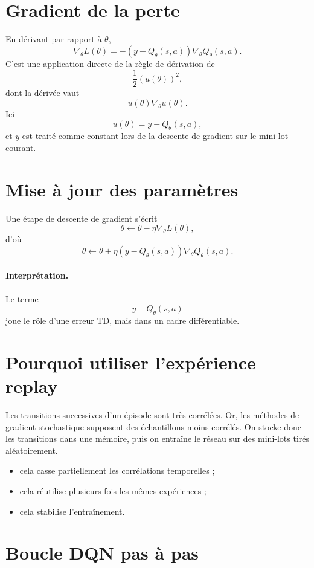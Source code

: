 \documentclass[11pt,a4paper]{article}
\begin{document}
\section{Gradient de la perte}

En dérivant par rapport à $\theta$,
\[
\nabla_{\theta}L(\theta)
= -\left(y-Q_{\theta}(s,a)\right)\nabla_{\theta}Q_{\theta}(s,a).
\]
C'est une application directe de la règle de dérivation de
\[
\frac12(u(\theta))^2,
\]
dont la dérivée vaut
\[
u(\theta)\nabla_{\theta}u(\theta).
\]
Ici
\[
u(\theta)=y-Q_{\theta}(s,a),
\]
et $y$ est traité comme constant lors de la descente de gradient sur le mini-lot courant.

\section{Mise à jour des paramètres}

Une étape de descente de gradient s'écrit
\[
\theta \leftarrow \theta - \eta \nabla_{\theta}L(\theta),
\]
d'où
\[
\theta \leftarrow \theta + \eta \left(y-Q_{\theta}(s,a)\right)\nabla_{\theta}Q_{\theta}(s,a).
\]

\paragraph{Interprétation.}
Le terme
\[
y-Q_{\theta}(s,a)
\]
joue le rôle d'une erreur TD, mais dans un cadre différentiable.

\section{Pourquoi utiliser l'expérience replay}

Les transitions successives d'un épisode sont très corrélées. Or, les méthodes de gradient stochastique supposent des échantillons moins corrélés. On stocke donc les transitions dans une mémoire, puis on entraîne le réseau sur des mini-lots tirés aléatoirement.

\begin{itemize}[leftmargin=1.6em]
    \item cela casse partiellement les corrélations temporelles ;
    \item cela réutilise plusieurs fois les mêmes expériences ;
    \item cela stabilise l'entraînement.
\end{itemize}

\section{Boucle DQN pas à pas}
\end{document}
